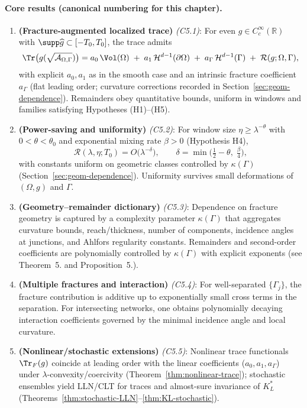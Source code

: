 \paragraph{Core results (canonical numbering for this chapter).}
\begin{enumerate}[label=\textbf{C\arabic*}.]
  \item \textbf{(Fracture-augmented localized trace)} \emph{(C5.1)}: For
  even $g\in C^\infty_c(\mathbb{R})$ with $\supp\widehat g \subset [-T_0,T_0]$,
  the trace admits
  \[
    \Tr\big(g(\sqrt{\mathcal{A}_{\Omega,\Gamma}})\big)
      = a_0\,\Vol(\Omega) \;+\; a_1\,\mathcal{H}^{d-1}(\partial\Omega)
      \;+\; a_\Gamma\,\mathcal{H}^{d-1}(\Gamma) \;+\; \mathcal{R}(g;\Omega,\Gamma),
  \]
  with explicit $a_0,a_1$ as in the smooth case and an intrinsic fracture
  coefficient $a_\Gamma$ (flat leading order; curvature corrections recorded
  in Section~\ref{sec:geom-dependence}). Remainders obey quantitative bounds,
  uniform in windows and families satisfying Hypotheses (H1)--(H5).

  \item \textbf{(Power-saving and uniformity)} \emph{(C5.2)}:
  For window size $\eta\ge \lambda^{-\theta}$ with $0<\theta<\theta_0$ and
  exponential mixing rate $\beta>0$ (Hypothesis H4),
  \[
    \mathcal{R}(\lambda,\eta;T_0) = O\!\big(\lambda^{-\delta}\big),
    \qquad \delta = \min\!\Big(\tfrac{1}{2}-\theta,\;\tfrac{\beta}{4}\Big),
  \]
  with constants uniform on geometric classes controlled by
  $\kappa(\Gamma)$ (Section~\ref{sec:geom-dependence}). Uniformity survives
  small deformations of $(\Omega,g)$ and $\Gamma$.

  \item \textbf{(Geometry–remainder dictionary)} \emph{(C5.3)}:
  Dependence on fracture geometry is captured by a complexity parameter
  $\kappa(\Gamma)$ that aggregates curvature bounds, reach/thickness,
  number of components, incidence angles at junctions,
  and Ahlfors regularity constants.
  Remainders and second-order coefficients are polynomially controlled by
  $\kappa(\Gamma)$ with explicit exponents (see Theorem~5. and
  Proposition~5.).

  \item \textbf{(Multiple fractures and interaction)} \emph{(C5.4)}:
  For well-separated $\{\Gamma_j\}$, the fracture contribution is additive
  up to exponentially small cross terms in the separation.
  For intersecting networks, one obtains polynomially decaying interaction
  coefficients governed by the minimal incidence angle and local curvature.

  \item \textbf{(Nonlinear/stochastic extensions)} \emph{(C5.5)}:
  Nonlinear trace functionals $\Tr_F(g)$ coincide at leading order with the
  linear coefficients ($a_0,a_1,a_\Gamma$) under $\lambda$-convexity/coercivity
  (Theorem~\ref{thm:nonlinear-trace});
  stochastic ensembles yield LLN/CLT for traces and almost-sure invariance of
  $K_L^*$ (Theorems~\ref{thm:stochastic-LLN}–\ref{thm:KL-stochastic}).
\end{enumerate}

